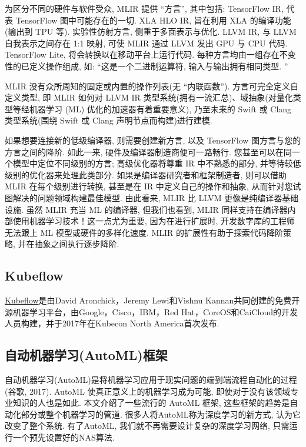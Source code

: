 为区分不同的硬件与软件受众, MLIR 提供 “方言”, 其中包括: TensorFlow IR, 代表 TensorFlow 图中可能存在的一切. XLA HLO IR, 旨在利用 XLA 的编译功能(输出到 TPU 等).
实验性仿射方言, 侧重于多面表示与优化. LLVM IR, 与 LLVM 自我表示之间存在 1:1 映射, 可使 MLIR 通过 LLVM 发出 GPU 与 CPU 代码.
TensorFlow Lite, 将会转换以在移动平台上运行代码.
每种方言均由一组存在不变性的已定义操作组成, 如: “这是一个二进制运算符, 输入与输出拥有相同类型. ”

MLIR 没有众所周知的固定或内置的操作列表(无 “内联函数”). 方言可完全定义自定义类型, 即 MLIR 如何对 LLVM IR 类型系统(拥有一流汇总)、域抽象(对量化类型等经机器学习 (ML) 优化的加速器有着重要意义), 乃至未来的 Swift 或 Clang 类型系统(围绕 Swift 或 Clang 声明节点而构建)进行建模.

如果想要连接新的低级编译器, 则需要创建新方言, 以及 TensorFlow 图方言与您的方言之间的降阶. 如此一来, 硬件及编译器制造商便可一路畅行. 您甚至可以在同一个模型中定位不同级别的方言; 高级优化器将尊重 IR 中不熟悉的部分, 并等待较低级别的优化器来处理此类部分.
如果是编译器研究者和框架制造者, 则可以借助 MLIR 在每个级别进行转换, 甚至是在 IR 中定义自己的操作和抽象, 从而针对您试图解决的问题领域构建最佳模型. 由此看来, MLIR 比 LLVM 更像是纯编译器基础设施.
虽然 MLIR 充当 ML 的编译器, 但我们也看到, MLIR 同样支持在编译器内部使用机器学习技术！这一点尤为重要, 因为在进行扩展时, 开发数字库的工程师无法跟上 ML 模型或硬件的多样化速度. MLIR 的扩展性有助于探索代码降阶策略, 并在抽象之间执行逐步降阶.
\subsection{Kubeflow}
\href{https://www.kubeflow.org/}{Kubeflow}是由David Aronchick，Jeremy Lewi和Vishnu Kannan共同创建的免费开源机器学习平台，由Google，Cisco，IBM，Red Hat，CoreOS和CaiCloud的开发人员构建，并于2017年在Kubecon North America首次发布.
\subsection{自动机器学习(AutoML)框架}
自动机器学习(AutoML)是将机器学习应用于现实问题的端到端流程自动化的过程(谷歌, 2017). AutoML 使真正意义上的机器学习成为可能, 即使对于没有该领域专业知识的人也是如此. 本文介绍了一些流行的 AutoML 框架, 这些框架的趋势是自动化部分或整个机器学习的管道.
很多人将AutoML称为深度学习的新方式, 认为它改变了整个系统. 有了AutoML, 我们就不再需要设计复杂的深度学习网络, 只需运行一个预先设置好的NAS算法.

